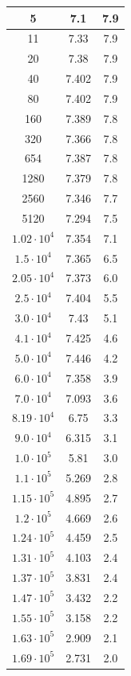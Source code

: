 \documentclass[a4paper,14pt]{article}
\begin{document}
\begin{longtable}{|c|c|c|}
5 & 7.1 & 7.9   \\ \hline
11 & 7.33 & 7.9   \\ \hline
20 & 7.38 & 7.9   \\ \hline
40 & 7.402 & 7.9   \\ \hline
80 & 7.402 & 7.9   \\ \hline
160 & 7.389 & 7.8   \\ \hline
320 & 7.366 & 7.8   \\ \hline
654 & 7.387 & 7.8   \\ \hline
1280 & 7.379 & 7.8   \\ \hline
2560 & 7.346 & 7.7   \\ \hline
5120 & 7.294 & 7.5   \\ \hline
$1.02 \cdot 10^4 $ & 7.354 & 7.1   \\ \hline
$1.5 \cdot 10^4 $ & 7.365 & 6.5   \\ \hline
$2.05 \cdot 10^4 $ & 7.373 & 6.0   \\ \hline
$2.5 \cdot 10^4 $ & 7.404 & 5.5   \\ \hline
$3.0 \cdot 10^4 $ & 7.43 & 5.1   \\ \hline
$4.1 \cdot 10^4 $ & 7.425 & 4.6   \\ \hline
$5.0 \cdot 10^4 $ & 7.446 & 4.2   \\ \hline
$6.0 \cdot 10^4 $ & 7.358 & 3.9   \\ \hline
$7.0 \cdot 10^4 $ & 7.093 & 3.6   \\ \hline
$8.19 \cdot 10^4 $ & 6.75 & 3.3   \\ \hline
$9.0 \cdot 10^4 $ & 6.315 & 3.1   \\ \hline
$1.0 \cdot 10^5 $ & 5.81 & 3.0   \\ \hline
$1.1 \cdot 10^5 $ & 5.269 & 2.8   \\ \hline
$1.15 \cdot 10^5 $ & 4.895 & 2.7   \\ \hline
$1.2 \cdot 10^5 $ & 4.669 & 2.6   \\ \hline
$1.24 \cdot 10^5 $ & 4.459 & 2.5   \\ \hline
$1.31 \cdot 10^5 $ & 4.103 & 2.4   \\ \hline
$1.37 \cdot 10^5 $ & 3.831 & 2.4   \\ \hline
$1.47 \cdot 10^5 $ & 3.432 & 2.2   \\ \hline
$1.55 \cdot 10^5 $ & 3.158 & 2.2   \\ \hline
$1.63 \cdot 10^5 $ & 2.909 & 2.1   \\ \hline
$1.69 \cdot 10^5 $ & 2.731 & 2.0   \\ \hline

\end{longtable}
\end{document}
